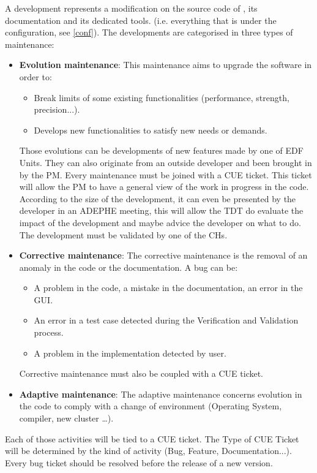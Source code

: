 A development represents a modification on the source code of \telemacsystem, its
documentation and its dedicated tools. (i.e. everything that is under the
configuration, see \ref{conf}). The developments are categorised in three types
of maintenance:
\begin{itemize}
\item \textbf{Evolution maintenance}: This maintenance aims to upgrade the
software in order to:
\begin{itemize}
\item Break limits of some existing functionalities (performance, strength,
precision...).
\item Develops new functionalities to satisfy new needs or demands. 
\end{itemize}
Those evolutions can be developments of new features made by one of EDF
Units. They can also originate from an outside developer and been brought in
by the PM.
Every maintenance must be joined with a CUE ticket. This ticket will allow the PM
to have a general view of the work in progress in the code. According to the
size of the development, it can even be presented by the developer in an ADEPHE
meeting, this will allow the TDT do evaluate the impact of the development and
maybe advice the developer on what to do. The development must be validated by
one of the CHs.
\item \textbf{Corrective maintenance}: The corrective maintenance is the removal
of an anomaly in the code or the documentation. A bug can be:
\begin{itemize}
\item A problem in the code, a mistake in the documentation, an error in
the GUI.
\item An error in a test case detected during the Verification and Validation
process.
\item A problem in the implementation detected by user.
\end{itemize}
Corrective maintenance must also be coupled with a CUE ticket.
\item \textbf{Adaptive maintenance}: The adaptive maintenance concerns evolution
in the code to comply with a change of environment (Operating System, compiler,
new cluster \ldots).
\end{itemize}

Each of those activities will be tied to a CUE ticket. The Type of CUE Ticket
will be determined by the kind of activity (Bug, Feature, Documentation...).
Every bug ticket should be resolved before the release of a new version.


